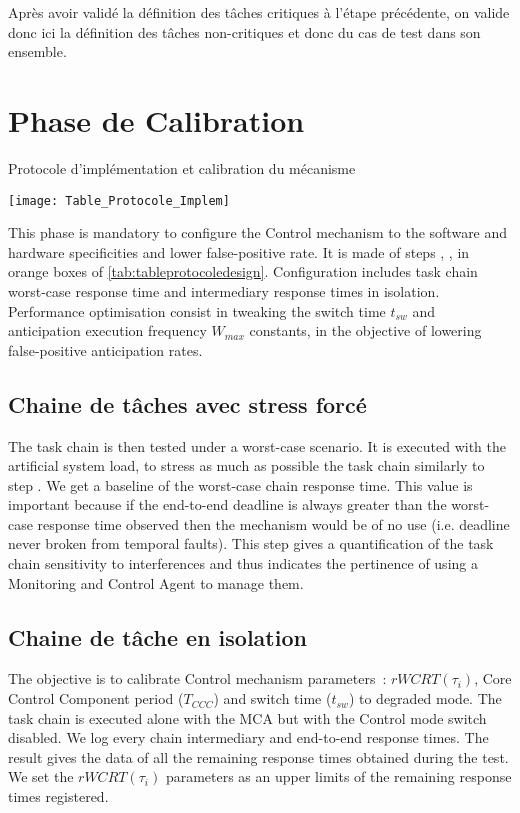 \documentclass[french, a4paper, 11pt, twoside, pdftex]{StyleThese}
\begin{document}
		Après avoir validé la définition des tâches critiques à l'étape précédente, on valide donc ici la définition des tâches non-critiques et donc du cas de test dans son ensemble.
		
		
                	

                	
                	
\section{Phase de Calibration}

            \begin{table}[ht]
				\centering
				\caption{Protocole d'implémentation et calibration du mécanisme}
				\label{tab:tableprotocoleImplementation}
				\texttt{[image: Table\_Protocole\_Implem]}
			\end{table}
            This phase is mandatory to configure the Control mechanism to the software and hardware specificities and lower false-positive rate. It is made of steps , ,  in orange boxes of \autoref{tab:tableprotocoledesign}. Configuration includes task chain worst-case response time and intermediary response times in isolation. Performance optimisation consist in tweaking the switch time $t_{sw}$ and anticipation execution frequency $W_{max}$ constants, in the objective of lowering false-positive anticipation rates.
            
    \subsection{Chaine de tâches avec stress forcé}
                    The task chain is then tested under a worst-case scenario. It is executed with the artificial system load, to stress as much as possible the task chain similarly to step . We get a baseline of the worst-case chain response time. This value is important because if the end-to-end deadline is always greater than the worst-case response time observed then the mechanism would be of no use (i.e. deadline never broken from temporal faults). This step gives a quantification of the task chain sensitivity to interferences and thus indicates the pertinence of using a Monitoring and Control Agent to manage them.
                    
    \subsection{Chaine de tâche en isolation}
                    The objective is to calibrate Control mechanism parameters~: $rWCRT(\tau_i)$, Core Control Component period ($T_{CCC}$) and switch time ($t_{sw}$) to degraded mode. The task chain is executed alone with the MCA but with the Control mode switch disabled. We log every chain intermediary and end-to-end response times. The result gives the data of all the remaining response times obtained during the test. We set the $rWCRT(\tau_i)$ parameters as an upper limits of the remaining response times registered.
                    
\end{document}
